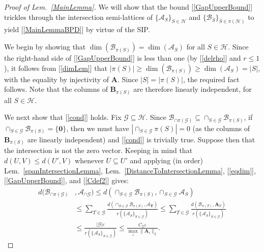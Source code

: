 \documentclass[9pt,twocolumn]{pnas-new}
\renewcommand{\eqref}[1]{\textnormal{[\ref{#1}]}}
\begin{document}
\begin{proof}[Proof of Lem.~\ref{MainLemma}]
We will show that the bound \eqref{GapUpperBound} trickles through the intersection semi-lattices of $\{\bm{\mathcal{A}}_S\}_{S \in \mathcal{H}}$ and $\{\bm{\mathcal{B}}_{\bar S}\}_{\bar S \in \pi(\mathcal{H})}$ to yield \eqref{MainLemmaBPD} by virtue of the SIP.  

We begin by showing that $\dim(\bm{\mathcal{B}}_{\pi(S)}) = \dim(\bm{\mathcal{A}}_S)$ for all $S \in \mathcal{H}$. Since the right-hand side of \eqref{GapUpperBound} is less than one (by \eqref{delrho} and $r \leq 1$), it follows from \eqref{dimLem} that $|\pi(S)| \geq \dim(\bm{\mathcal{B}}_{\pi(S)}) \geq \dim(\bm{\mathcal{A}}_S) = |S|$, with the equality by injectivity of $\mathbf{A}$. Since $|S| = |\pi(S)|$, the required fact follows. Note that the columns of $\mathbf{B}_{\pi(S)}$ are therefore linearly independent, for all $S \in \mathcal{H}$.

We next show that \eqref{cond} holds.  Fix $\mathcal{G} \subseteq \mathcal{H}$. Since $\bm{\mathcal{B}}_{\cap \pi(\mathcal{G})} \subseteq \cap_{S \in \mathcal{G}} \bm{\mathcal{B}}_{\pi(S)}$, if $\cap_{S \in \mathcal{G}} \bm{\mathcal{B}}_{\pi(S)} = \{\textbf{0}\}$, then we must have $|\cap_{S \in \mathcal{G}} \pi(S)| = 0$ (as the columns of $\mathbf{B}_{\pi(S)}$ are linearly independent) and \eqref{cond} is trivially true. Suppose then that the intersection is not the zero vector. Keeping in mind that $d(U,V) \leq d(U',V)$ whenever $U \subseteq U'$ and applying (in order) Lem.~\ref{spanIntersectionLemma}, Lem.~\ref{DistanceToIntersectionLemma}, \eqref{eqdim}, \eqref{GapUpperBound}, and \eqref{Cdef2} gives:
\begin{align}\label{randoml}
d(\bm{\mathcal{B}}_{\cap \pi(\mathcal{G})}&, \bm{\mathcal{A}}_{\cap \mathcal{G}}  ) 
\leq d\left( \cap_{S \in \mathcal{G}} \bm{\mathcal{B}}_{\pi(S)}, \cap_{S \in \mathcal{G}} \bm{\mathcal{A}}_S \right) \nonumber \\
&\leq \sum_{T \in \mathcal{G}} \frac{ d\left( \cap_{S \in \mathcal{G}} \bm{\mathcal{B}}_{\pi(S)},\bm{\mathcal{A}_{T}} \right) }{ r(  \{\bm{\mathcal{A}}_S\}_{S \in \mathcal{G}}) }
\leq \sum_{T \in \mathcal{G}} \frac{ d\left( \bm{\mathcal{B}}_{\pi(T)},\bm{\mathbf{A}}_{T} \right) }{ r( \{\bm{\mathcal{A}}_S\}_{S \in \mathcal{G}}) }\nonumber \\
&\leq \frac{|\mathcal{G}| \varepsilon}{r( \{\bm{\mathcal{A}}_S\}_{S \in \mathcal{G}})} 
\leq \frac{C_2 \varepsilon}{\max_i\|\mathbf{A}_i\|_2}. 
\end{align}


\end{proof}
\end{document}
